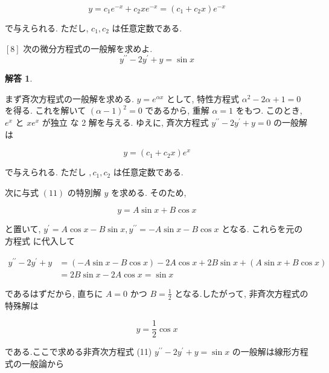 \documentclass[10pt]{jsarticle}
\newtheorem*{answer*}{解答}
\begin{document}
$$
y=c_{1} e^{-x}+c_{2} x e^{-x}=\left(c_{1}+c_{2} x\right) e^{-x}
$$

で与えられる. ただし, $c_{1}, c_{2}$ は任意定数である.

\bigskip
\bigskip
\bigskip
\bigskip
\bigskip
\bigskip
\bigskip
\bigskip
\bigskip
\bigskip
\bigskip
\bigskip
\bigskip
\bigskip

\begin{itembox}[l]{$[8]$ 次の微分方程式の一般解を求めよ.}
\begin{equation*}
y^{\prime \prime}-2 y^{\prime}+y=\sin x \tag{11}
\end{equation*}  
\end{itembox}

\bigskip

\begin{answer*}
\end{answer*}

まず斉次方程式の一般解を求める. $y=e^{\alpha x}$ として, 特性方程式 $\alpha^{2}-2 \alpha+1=0$ を得る. これを解いて $(\alpha-1)^{2}=0$ であるから, 重解 $\alpha=1$ をもつ. このとき, $e^{x}$ と $x e^{x}$ が独立 な 2 解を与える. ゆえに, 斉次方程式 $y^{\prime \prime}-2 y^{\prime}+y=0$ の一般解は

$$
y=\left(c_{1}+c_{2} x\right) e^{x}
$$

で与えられる. ただし $, c_{1}, c_{2}$ は任意定数である.

次に与式 $(11)$ の特別解 $y$ を求める. そのため,


\begin{equation*}
y=A \sin x+B \cos x \tag{*1}
\end{equation*}


と置いて, $y^{\prime}=A \cos x-B \sin x, y^{\prime \prime}=-A \sin x-B \cos x$ となる. これらを元の方程式 に代入して

$$
\begin{aligned}
y^{\prime \prime}-2 y^{\prime}+y & =(-A \sin x-B \cos x)-2 A \cos x+2 B \sin x+(A \sin x+B \cos x) \\
& =2 B \sin x-2 A \cos x=\sin x
\end{aligned}
$$

であるはずだから, 直ちに $A=0$ かつ $B=\frac{1}{2}$ となる.したがって, 非斉次方程式の特殊解は


\begin{equation*}
y=\frac{1}{2} \cos x \tag{*2}
\end{equation*}


である.ここで求める非斉次方程式 (11) $y^{\prime \prime}-2 y^{\prime}+y=\sin x$ の一般解は線形方程式の一般論から
\end{document}
